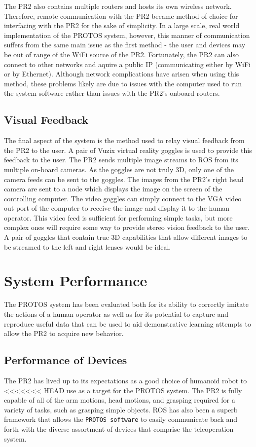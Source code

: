 \documentclass{sig-alternate}
\begin{document}
\indent The PR2 also contains multiple routers and hosts its
own wireless network. Therefore, remote communication with the PR2 became method of choice for interfacing
with the PR2 for the sake of simplicity. In a large scale, real world implementation of the PROTOS system, however,
this manner of communication suffers from the same main issue as the first method - the user and devices
may be out of range of the WiFi source of the PR2. Fortunately,
the PR2 can also connect to other networks and aquire a public IP
(communicating either by WiFi or by
Ethernet). Although network complications have arisen when using this method,
these problems likely are due to issues with the computer used to run the system software 
rather than issues with the PR2's onboard routers.

\subsection{Visual Feedback}
\indent The final aspect of the system is the method used to relay visual feedback from the PR2 to the user.
A pair of  Vuzix virtual reality goggles is used to provide this feedback to the user. The PR2 sends multiple image 
streams to ROS from its multiple on-board cameras. As the goggles are not truly 3D, only one of the camera feeds
can be sent to the goggles. The images from the PR2's right head camera are sent to a node which displays the image
on the screen of the controlling computer. The video goggles can simply connect
to the VGA video out port of the computer to
receive the image and display it to the human operator. This video feed is sufficient
for performing simple tasks, but more complex ones will require some way to provide stereo vision feedback
to the user. A pair of goggles that contain true 3D capabilities that allow different images to be streamed
to the left and right lenses would be ideal.

\section{System Performance}
\label{sec:system_performance}
\indent The PROTOS system has been evaluated both for its ability to correctly
imitate the actions of a human operator as well as for its potential 
to capture and reproduce useful data that can be used to aid demonstrative learning
attempts to allow the PR2 to acquire new behavior.

\subsection{Performance of Devices}
\indent The PR2 has lived up to its expectations as a good choice of humanoid robot to 
<<<<<<< HEAD
use as a target for the PROTOS system. The 
PR2 is fully capable of all of the arm motions, head motions, and grasping
required for a variety of tasks, such as grasping simple objects. ROS has also been a superb framework that allows the 
{\tt PROTOS software} to easily communicate back and forth with the diverse 
assortment of devices that comprise the teleoperation system.
\end{document}
